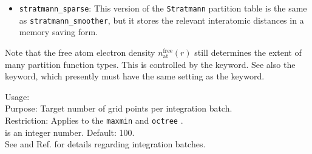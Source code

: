 \begin{itemize}
    through Eqs. (11) / (14), the distance from which an atom can contribute is restricted, but
    potentially to a very large radius indeed. This becomes a problem for periodic systems (in our case,
    a theoretical radius of 25 {\AA} would have resulted even for light settings and the farthest grid
    points from each atom, set to 5~{\AA} for light settings). \\
    To avoid an overly large volume of contributing atoms, we restrict the list of contributing atoms
    to only those whose free-atom charge density would not be zero at the integration point in question.
    To that end, Eq. (8) of Ref. \cite{Stratmann96} is additionally multiplied with a function that 
    smoothly interpolates between the original $s$ of Stratmann and coworkers and unity. The interpolation
    is done only for atom distances between 0.8 and 1.0 times their free-atom radius, and uses a 
    $[1-\cos(2x)]$-like interpolating function. The bottom line is that we get the benefits of both
    the Stratmann table and a restricted atom list without any discontinuities or wiggles as a 
    function of atomic positions or unit cell vectors --- which is as it should be.
  \item \texttt{stratmann\_sparse}: This version of the \texttt{Stratmann} partition table is the same as
    \texttt{stratmann\_smoother}, but it stores the relevant interatomic distances in a memory saving form.
\end{itemize}
Note that the free atom electron density $n_\text{at}^\text{free}(r)$
still determines the extent of many partition function types. This is
controlled by the  keyword. See
also the 
keyword, which presently must have the same setting as the
 keyword.

{
  \noindent
  Usage:   \\[1.0ex]
  Purpose: Target number of grid points per integration batch. \\[1.0ex]
  Restriction: Applies to the \texttt{maxmin} and \texttt{octree}
    . \\[1.0ex] 
   is an integer number. Default: 100. \\
}
See  and Ref. \cite{Havu08} for
details regarding integration batches. 


\newpage

